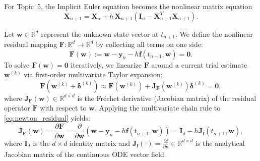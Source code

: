 For Topic~5, the Implicit Euler equation becomes the nonlinear matrix
equation
\begin{equation}
\label{eq:topic5_implicit_euler}
\mathbf{X}_{n+1}
=\mathbf{X}_n+h\,\mathbf{X}_{n+1}
\left(\mathbf{I}_n-\mathbf{X}_{n+1}^T\mathbf{X}_{n+1}\right).
\end{equation}

Let $\mathbf{w} \in \mathbb{R}^d$ represent the unknown state vector at $t_{n+1}$. We define the nonlinear residual mapping $\mathbf{F}: \mathbb{R}^d \to \mathbb{R}^d$ by collecting all terms on one side:
\begin{equation}
\label{eq:newton_residual}
\mathbf{F}(\mathbf{w}) := \mathbf{w} - \mathbf{y}_n - h \mathbf{f}(t_{n+1}, \mathbf{w}) = \mathbf{0}.
\end{equation}
To solve $\mathbf{F}(\mathbf{w}) = \mathbf{0}$ iteratively, we linearize $\mathbf{F}$ around a current trial estimate $\mathbf{w}^{(k)}$ via first-order multivariate Taylor expansion:
\begin{equation}
\label{eq:taylor_residual}
\mathbf{F}\left(\mathbf{w}^{(k)} + \boldsymbol{\delta}^{(k)}\right) \approx \mathbf{F}\left(\mathbf{w}^{(k)}\right) + \mathbf{J}_{\mathbf{F}}\left(\mathbf{w}^{(k)}\right) \boldsymbol{\delta}^{(k)} = \mathbf{0},
\end{equation}
where $\mathbf{J}_{\mathbf{F}}(\mathbf{w}) \in \mathbb{R}^{d \times d}$ is the Fr\'echet derivative (Jacobian matrix) of the residual operator $\mathbf{F}$ with respect to $\mathbf{w}$. Applying the multivariate chain rule to \eqref{eq:newton_residual} yields:
\begin{equation}
\label{eq:residual_jacobian}
\mathbf{J}_{\mathbf{F}}(\mathbf{w}) = \frac{\partial \mathbf{F}}{\partial \mathbf{w}} = \frac{\partial}{\partial \mathbf{w}} \left(\mathbf{w} - \mathbf{y}_n - h \mathbf{f}(t_{n+1}, \mathbf{w})\right) = \mathbf{I}_d - h \mathbf{J}_{\mathbf{f}}(t_{n+1}, \mathbf{w}),
\end{equation}
where $\mathbf{I}_d$ is the $d \times d$ identity matrix and $\mathbf{J}_{\mathbf{f}}(\cdot) = \frac{\partial \mathbf{f}}{\partial \mathbf{y}} \in \mathbb{R}^{d \times d}$ is the analytical Jacobian matrix of the continuous ODE vector field.

